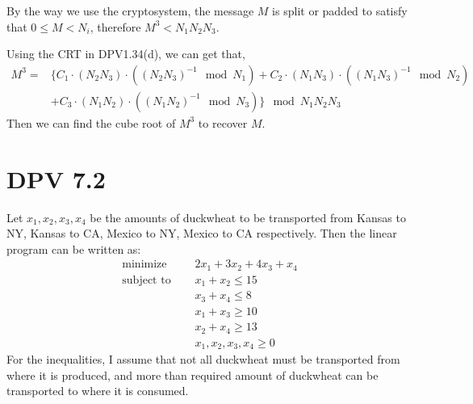 \documentclass[twoside]{homework}
\begin{document}
By the way we use the cryptosystem, the message $M$ is split or padded to satisfy that $0\leq M < N_i$, therefore $M^3 < N_1N_2N_3$.

Using the CRT in DPV1.34(d), we can get that,
\begin{align*}
	M^3 = &\{C_1\cdot(N_2N_3)\cdot((N_2N_3)^{-1}\mod N_1) + C_2\cdot(N_1N_3)\cdot((N_1N_3)^{-1}\mod N_2) \\
	&+ C_3\cdot(N_1N_2)\cdot((N_1N_2)^{-1}\mod N_3)\} \mod {N_1N_2N_3}
\end{align*}
Then we can find the cube root of $M^3$ to recover $M$.

\section{DPV 7.2}
Let $x_1, x_2, x_3, x_4$ be the amounts of duckwheat to be transported from Kansas to NY, Kansas to CA, Mexico to NY, Mexico to CA respectively. Then the linear program can be written as:
\begin{align*}
	\text{minimize }\quad &2x_1 + 3x_2 + 4x_3 + x_4 \\
	\text{subject to }\quad & x_1 + x_2 \leq 15 \\
	& x_3 + x_4 \leq 8 \\
	& x_1 + x_3 \geq 10 \\
	& x_2 + x_4 \geq 13 \\
	& x_1, x_2, x_3, x_4 \geq 0
\end{align*}
For the inequalities, I assume that not all duckwheat must be transported from where it is produced, and more than required amount of duckwheat can be transported to where it is consumed.
\end{document}
